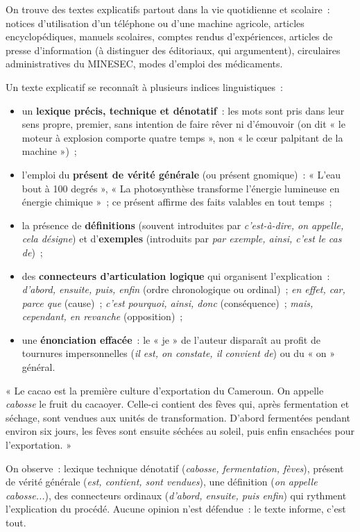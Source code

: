 \documentclass[11pt]{article}
\begin{document}
On trouve des textes explicatifs partout dans la vie quotidienne et scolaire~: notices d'utilisation d'un téléphone ou d'une machine agricole, articles encyclopédiques, manuels scolaires, comptes rendus d'expériences, articles de presse d'information (à distinguer des éditoriaux, qui argumentent), circulaires administratives du MINESEC, modes d'emploi des médicaments.

\begin{propriete}
Un texte explicatif se reconnaît à plusieurs indices linguistiques~:
\begin{itemize}
\item un \textbf{lexique précis, technique et dénotatif}~: les mots sont pris dans leur sens propre, premier, sans intention de faire rêver ni d'émouvoir (on dit « le moteur à explosion comporte quatre temps », non « le cœur palpitant de la machine »)~;
\item l'emploi du \textbf{présent de vérité générale} (ou présent gnomique)~: « L'eau bout à 100 degrés », « La photosynthèse transforme l'énergie lumineuse en énergie chimique »~; ce présent affirme des faits valables en tout temps~;
\item la présence de \textbf{définitions} (souvent introduites par \emph{c'est-à-dire, on appelle, cela désigne}) et d'\textbf{exemples} (introduits par \emph{par exemple, ainsi, c'est le cas de})~;
\item des \textbf{connecteurs d'articulation logique} qui organisent l'explication~: \emph{d'abord, ensuite, puis, enfin} (ordre chronologique ou ordinal)~; \emph{en effet, car, parce que} (cause)~; \emph{c'est pourquoi, ainsi, donc} (conséquence)~; \emph{mais, cependant, en revanche} (opposition)~;
\item une \textbf{énonciation effacée}~: le « je » de l'auteur disparaît au profit de tournures impersonnelles (\emph{il est, on constate, il convient de}) ou du « on » général.
\end{itemize}
\end{propriete}

\begin{exemplebox}
« Le cacao est la première culture d'exportation du Cameroun. On appelle \emph{cabosse} le fruit du cacaoyer. Celle-ci contient des fèves qui, après fermentation et séchage, sont vendues aux unités de transformation. D'abord fermentées pendant environ six jours, les fèves sont ensuite séchées au soleil, puis enfin ensachées pour l'exportation. »

On observe~: lexique technique dénotatif (\emph{cabosse, fermentation, fèves}), présent de vérité générale (\emph{est, contient, sont vendues}), une définition (\emph{on appelle cabosse...}), des connecteurs ordinaux (\emph{d'abord, ensuite, puis enfin}) qui rythment l'explication du procédé. Aucune opinion n'est défendue~: le texte informe, c'est tout.
\end{exemplebox}
\end{document}
